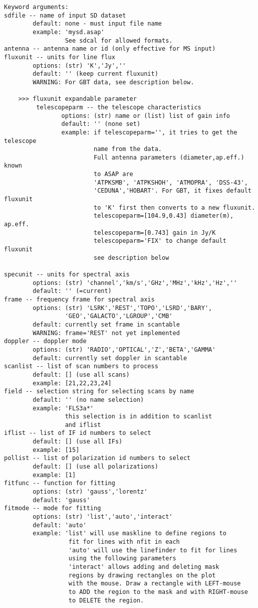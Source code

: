\begin{verbatim}
Keyword arguments:
sdfile -- name of input SD dataset
        default: none - must input file name
        example: 'mysd.asap'
                 See sdcal for allowed formats.
antenna -- antenna name or id (only effective for MS input)
fluxunit -- units for line flux
        options: (str) 'K','Jy',''
        default: '' (keep current fluxunit)
        WARNING: For GBT data, see description below.
        
    >>> fluxunit expandable parameter
         telescopeparm -- the telescope characteristics
                options: (str) name or (list) list of gain info
                default: '' (none set)
                example: if telescopeparm='', it tries to get the telescope
                         name from the data.
                         Full antenna parameters (diameter,ap.eff.) known
                         to ASAP are
                         'ATPKSMB', 'ATPKSHOH', 'ATMOPRA', 'DSS-43',
                         'CEDUNA','HOBART'. For GBT, it fixes default fluxunit
                         to 'K' first then converts to a new fluxunit.
                         telescopeparm=[104.9,0.43] diameter(m), ap.eff.
                         telescopeparm=[0.743] gain in Jy/K
                         telescopeparm='FIX' to change default fluxunit
                         see description below
        
specunit -- units for spectral axis
        options: (str) 'channel','km/s','GHz','MHz','kHz','Hz',''
        default: '' (=current)
frame -- frequency frame for spectral axis
        options: (str) 'LSRK','REST','TOPO','LSRD','BARY',
                 'GEO','GALACTO','LGROUP','CMB'
        default: currently set frame in scantable
        WARNING: frame='REST' not yet implemented
doppler -- doppler mode
        options: (str) 'RADIO','OPTICAL','Z','BETA','GAMMA'
        default: currently set doppler in scantable
scanlist -- list of scan numbers to process
        default: [] (use all scans)
        example: [21,22,23,24]
field -- selection string for selecting scans by name
        default: '' (no name selection)
        example: 'FLS3a*'
                 this selection is in addition to scanlist
                 and iflist
iflist -- list of IF id numbers to select
        default: [] (use all IFs)
        example: [15]
pollist -- list of polarization id numbers to select
        default: [] (use all polarizations)
        example: [1]
fitfunc -- function for fitting
        options: (str) 'gauss','lorentz'
        default: 'gauss'
fitmode -- mode for fitting
        options: (str) 'list','auto','interact'
        default: 'auto'
        example: 'list' will use maskline to define regions to
                  fit for lines with nfit in each
                  'auto' will use the linefinder to fit for lines
                  using the following parameters
                  'interact' allows adding and deleting mask 
                  regions by drawing rectangles on the plot 
                  with the mouse. Draw a rectangle with LEFT-mouse 
                  to ADD the region to the mask and with RIGHT-mouse 
                  to DELETE the region. 
                  

\end{verbatim}
